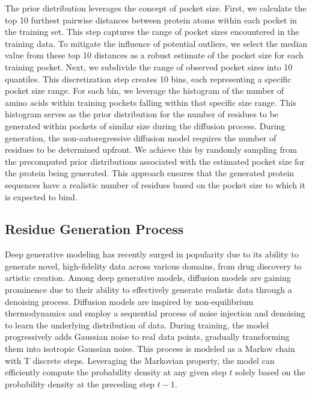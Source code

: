 The prior distribution leverages the concept of pocket size. First, we calculate the top 10 furthest pairwise distances between protein atoms within each pocket in the training set. This step captures the range of pocket sizes encountered in the training data. To mitigate the influence of potential outliers, we select the median value from these top 10 distances as a robust estimate of the pocket size for each training pocket. Next, we subdivide the range of observed pocket sizes into 10 quantiles. This discretization step creates 10 bins, each representing a specific pocket size range. For each bin, we leverage the histogram of the number of amino acids within training pockets falling within that specific size range. This histogram serves as the prior distribution for the number of residues to be generated within pockets of similar size during the diffusion process. During generation, the non-autoregressive diffusion model requires the number of residues to be determined upfront.  We achieve this by randomly sampling from the precomputed prior distributions associated with the estimated pocket size for the protein being generated. This approach ensures that the generated protein sequences have a realistic number of residues based on the pocket size to which it is expected to bind.

\subsection{Residue Generation Process}
Deep generative modeling has recently surged in popularity due to its ability to generate novel, high-fidelity data across various domains, from drug discovery to artistic creation. Among deep generative models, diffusion models are gaining prominence due to their ability to effectively generate realistic data through a denoising process. Diffusion models are inspired by non-equilibrium thermodynamics \cite{sohl2015deep, ho2020denoising} and employ a sequential process of noise injection and denoising to learn the underlying distribution of data. During training, the model progressively adds Gaussian noise to real data points, gradually transforming them into isotropic Gaussian noise. This process is modeled as a Markov chain with T discrete steps. Leveraging the Markovian property, the model can efficiently compute the probability density at any given step $t$ solely based on the probability density at the preceding step $t-1$. \\

